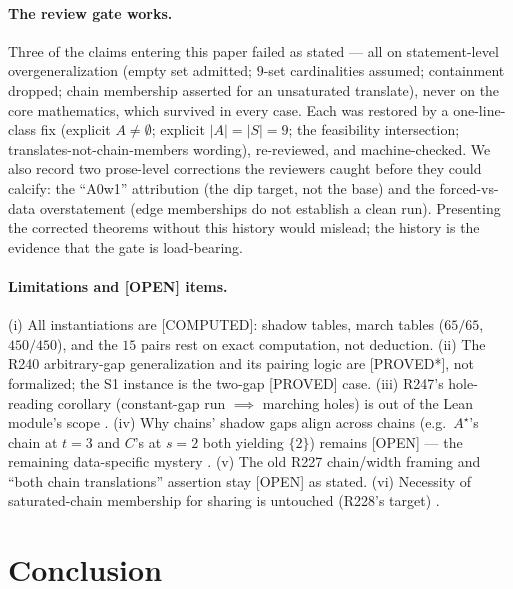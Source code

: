 \documentclass[11pt,a4paper]{article}
\theoremstyle{definition}
\begin{document}
\paragraph{The review gate works.} Three of the claims entering this
paper failed as stated --- all on statement-level overgeneralization
(empty set admitted; $9$-set cardinalities assumed; containment
dropped; chain membership asserted for an unsaturated translate),
never on the core mathematics, which survived in every case. Each was
restored by a one-line-class fix (explicit $A\ne\emptyset$; explicit
$|A|=|S|=9$; the feasibility intersection; translates-not-chain-members
wording), re-reviewed, and machine-checked. We also record two
prose-level corrections the reviewers caught before they could
calcify: the ``A0w1'' attribution (the dip target, not the base) and
the forced-vs-data overstatement (edge memberships do not establish a
clean run). Presenting the corrected theorems without this history
would mislead; the history is the evidence that the gate is load-bearing.

\paragraph{Limitations and [OPEN] items.} (i) All instantiations are
[COMPUTED]: shadow tables, march tables ($65/65$, $450/450$), and the
$15$ pairs rest on exact computation, not deduction. (ii) The R240
arbitrary-gap generalization and its pairing logic are [PROVED*],
not formalized; the S1 instance is the two-gap [PROVED] case.
(iii) R247's hole-reading corollary (constant-gap run $\implies$
marching holes) is out of the Lean module's scope \cite{D262}.
(iv) Why chains' shadow gaps align across chains (e.g.\ $A^\star$'s
chain at $t=3$ and $C$'s at $s=2$ both yielding $\{2\}$) remains
[OPEN] --- the remaining data-specific mystery \cite{D227}. (v) The
old R227 chain/width framing and ``both chain translations'' assertion
stay [OPEN] as stated. (vi) Necessity of saturated-chain membership
for sharing is untouched (R228's target) \cite{D227}.

\section{Conclusion}
\end{document}
